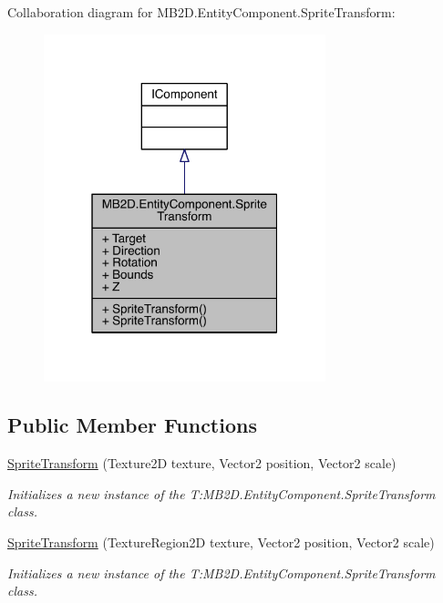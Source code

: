 Collaboration diagram for M\+B2\+D.\+Entity\+Component.\+Sprite\+Transform\+:
\nopagebreak
\begin{figure}[H]
\begin{center}
\leavevmode
\includegraphics[width=232pt]{class_m_b2_d_1_1_entity_component_1_1_sprite_transform__coll__graph}
\end{center}
\end{figure}
\subsection*{Public Member Functions}
\begin{DoxyCompactItemize}
\item 
\hyperlink{class_m_b2_d_1_1_entity_component_1_1_sprite_transform_a76c00772a0190f598f50e13f160ea6ca}{Sprite\+Transform} (Texture2D texture, Vector2 position, Vector2 scale)
\begin{DoxyCompactList}\small\item\em Initializes a new instance of the T\+:\+M\+B2\+D.\+Entity\+Component.\+Sprite\+Transform class. \end{DoxyCompactList}\item 
\hyperlink{class_m_b2_d_1_1_entity_component_1_1_sprite_transform_a4d58f27164fa424eb839e74be97e238c}{Sprite\+Transform} (Texture\+Region2D texture, Vector2 position, Vector2 scale)
\begin{DoxyCompactList}\small\item\em Initializes a new instance of the T\+:\+M\+B2\+D.\+Entity\+Component.\+Sprite\+Transform class. \end{DoxyCompactList}\end{DoxyCompactItemize}

